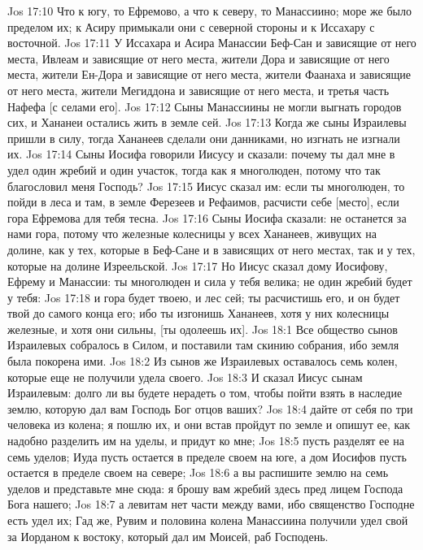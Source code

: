 \vs Jos 17:10 Что к югу, то Ефремово, а что к северу, то Манассиино; море же было пределом их; к Асиру примыкали они с северной стороны и к Иссахару с восточной.
\vs Jos 17:11 У Иссахара и Асира  Манассии Беф-Сан и зависящие от него места, Ивлеам и зависящие от него места, жители Дора и зависящие от него места, жители Ен-Дора и зависящие от него места, жители Фаанаха и зависящие от него места, жители Мегиддона и зависящие от него места, и третья часть Нафефа [с селами его].
\vs Jos 17:12 Сыны Манассиины не могли выгнать  городов сих, и Хананеи остались жить в земле сей.
\vs Jos 17:13 Когда же сыны Израилевы пришли в силу, тогда Хананеев сделали они данниками, но изгнать не изгнали их.
\rsbpar\vs Jos 17:14 Сыны Иосифа говорили Иисусу и сказали: почему ты дал мне в удел один жребий и один участок, тогда как я многолюден, потому что так благословил меня Господь?
\vs Jos 17:15 Иисус сказал им: если ты многолюден, то пойди в леса и там, в земле Ферезеев и Рефаимов, расчисти себе [место], если гора Ефремова для тебя тесна.
\vs Jos 17:16 Сыны Иосифа сказали: не останется за нами гора, потому что железные колесницы у всех Хананеев, живущих на долине, как у тех, которые в Беф-Сане и в зависящих от него местах, так и у тех, которые на долине Изреельской.
\vs Jos 17:17 Но Иисус сказал дому Иосифову, Ефрему и Манассии: ты многолюден и сила у тебя велика; не один жребий будет у тебя:
\vs Jos 17:18 и гора будет твоею, и лес сей; ты расчистишь его, и он будет твой до самого конца его; ибо ты изгонишь Хананеев, хотя у них колесницы железные, и хотя они сильны, [ты одолеешь их].
\vs Jos 18:1 Все общество сынов Израилевых собралось в Силом, и поставили там скинию собрания, ибо земля была покорена ими.
\vs Jos 18:2 Из сынов же Израилевых оставалось семь колен, которые еще не получили удела своего.
\vs Jos 18:3 И сказал Иисус сынам Израилевым: долго ли вы будете нерадеть о том, чтобы пойти  взять в наследие землю, которую дал вам Господь Бог отцов ваших?
\vs Jos 18:4 дайте от себя по три человека из колена; я пошлю их, и они встав пройдут по земле и опишут ее, как надобно разделить им на уделы, и придут ко мне;
\vs Jos 18:5 пусть разделят ее на семь уделов; Иуда пусть остается в пределе своем на юге, а дом Иосифов пусть остается в пределе своем на севере;
\vs Jos 18:6 а вы распишите землю на семь уделов и представьте мне сюда: я брошу вам жребий здесь пред лицем Господа Бога нашего;
\vs Jos 18:7 а левитам нет части между вами, ибо священство Господне есть удел их; Гад же, Рувим и половина колена Манассиина получили удел свой за Иорданом к востоку, который дал им Моисей, раб Господень.

